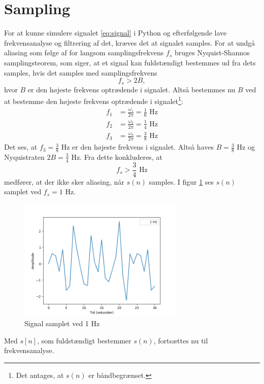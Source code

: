 \section{Sampling}
For at kunne simulere signalet \eqref{eq:signal} i Python og efterfølgende lave frekvensanalyse og filtrering af det, kræves det at signalet samples. 
For at undgå aliasing som følge af for langsom samplingsfrekvens $f_s$ bruges Nyquist-Shannos samplingsteorem, som siger, at et signal kan fuldstændigt bestemmes ud fra dets samples, hvis det samples med samplingsfrekvens
\begin{equation}
f_s>2B,
\end{equation}
hvor $B$ er den højeste frekvens optrædende i signalet. Altså bestemmes nu $B$ ved at bestemme den højeste frekvens optrædende i signalet\footnote{Det antages, at $s(n)$ er båndbegrænset.}:
\begin{align*}
f_1&=\frac{\omega_1}{2\pi}=\frac{1}{6}\text{ Hz}\\
f_2&=\frac{\omega_2}{2\pi}=\frac{1}{4}\text{ Hz}\\
f_3&=\frac{\omega_3}{2\pi}=\frac{3}{8}\text{ Hz}
\end{align*}
Det ses, at $f_3=\frac{3}{8}$ Hz er den højeste frekvens i signalet. Altså haves $B=\frac{3}{8}$ Hz og Nyquistraten $2B=\frac{3}{4}$ Hz. Fra dette konkluderes, at
\begin{equation}
f_s>\frac{3}{4}\text{ Hz}
\end{equation}
medfører, at der ikke sker aliasing, når $s(n)$ samples. I figur \ref{fig:s_sampled} ses $s(n)$ samplet ved $f_s=1$ Hz.
\begin{figure}[H]
\centering
\includegraphics[width=0.7\textwidth]{figures/signal_1hz}
\caption{Signal samplet ved 1 Hz}
\label{fig:s_sampled}
\end{figure}
Med $s[n]$, som fuldstændigt bestemmer $s(n)$, fortsættes nu til frekvensanalyse.
